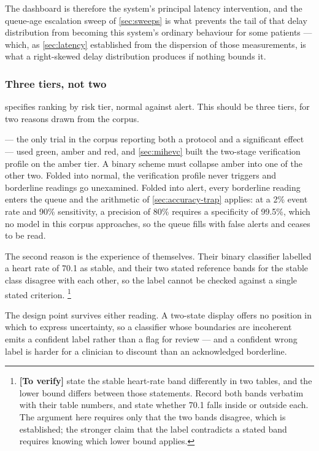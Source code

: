 \documentclass[12pt,a4paper,oneside]{report}
\newcommand{\verify}[1]{\footnote{\textbf{[To verify]} #1}}
\begin{document}
The dashboard is therefore the system's principal latency intervention, and the queue-age escalation sweep of \cref{sec:sweeps} is what prevents the tail of that delay distribution from becoming this system's ordinary behaviour for some patients --- which, as \cref{sec:latency} established from the dispersion of those measurements, is what a right-skewed delay distribution produces if nothing bounds it.

\subsubsection{Three tiers, not two}\label{sec:three-tiers}

\Textcite{cadrage2026} specifies ranking by risk tier, normal against alert. This should be three tiers, for two reasons drawn from the corpus.

\Textcite{mihevc2025} --- the only trial in the corpus reporting both a protocol and a significant effect --- used green, amber and red, and \cref{sec:mihevc} built the two-stage verification profile on the amber tier. A binary scheme must collapse amber into one of the other two. Folded into normal, the verification profile never triggers and borderline readings go unexamined. Folded into alert, every borderline reading enters the queue and the arithmetic of \cref{sec:accuracy-trap} applies: at a 2\% event rate and 90\% sensitivity, a precision of 80\% requires a specificity of 99.5\%, which no model in this corpus approaches, so the queue fills with false alerts and ceases to be read.

The second reason is the experience of \textcite{efendi2025} themselves. Their binary classifier labelled a heart rate of 70.1 as stable, and their two stated reference bands for the stable class disagree with each other, so the label cannot be checked against a single stated criterion.%
\verify{\Textcite{efendi2025} state the stable heart-rate band differently in two tables, and the lower bound differs between those statements. Record both bands verbatim with their table numbers, and state whether 70.1 falls inside or outside each. The argument here requires only that the two bands disagree, which is established; the stronger claim that the label contradicts a stated band requires knowing which lower bound applies.}

The design point survives either reading. A two-state display offers no position in which to express uncertainty, so a classifier whose boundaries are incoherent emits a confident label rather than a flag for review --- and a confident wrong label is harder for a clinician to discount than an acknowledged borderline.
\end{document}
